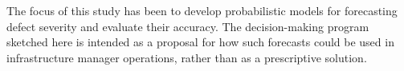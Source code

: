 The focus of this study has been to develop probabilistic models for forecasting defect severity and evaluate their accuracy. 
The decision-making program sketched here is intended as a proposal for how such forecasts could be used in infrastructure manager operations, rather than as a prescriptive solution.


%
%
%
%
